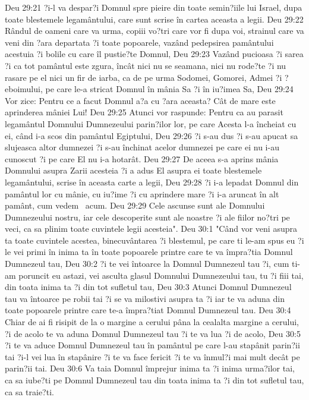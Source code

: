 Deu 29:21  ?i-l va despar?i Domnul spre pieire din toate semin?iile lui Israel, dupa toate blestemele legamântului, care sunt scrise în cartea aceasta a legii.
Deu 29:22  Rândul de oameni care va urma, copiii vo?tri care vor fi dupa voi, strainul care va veni din ?ara departata ?i toate popoarele, vazând pedepsirea pamântului acestuia ?i bolile cu care îl pustie?te Domnul,
Deu 29:23  Vazând pucioasa ?i sarea ?i ca tot pamântul este zgura, încât nici nu se seamana, nici nu rode?te ?i nu rasare pe el nici un fir de iarba, ca de pe urma Sodomei, Gomorei, Admei ?i ?eboimului, pe care le-a stricat Domnul în mânia Sa ?i în iu?imea Sa,
Deu 29:24  Vor zice: Pentru ce a facut Domnul a?a cu ?ara aceasta? Cât de mare este aprinderea mâniei Lui!
Deu 29:25  Atunci vor raspunde: Pentru ca au parasit legamântul Domnului Dumnezeului parin?ilor lor, pe care Acesta l-a încheiat cu ei, când i-a scos din pamântul Egiptului,
Deu 29:26  ?i s-au dus ?i s-au apucat sa slujeasca altor dumnezei ?i s-au închinat acelor dumnezei pe care ei nu i-au cunoscut ?i pe care El nu i-a hotarât.
Deu 29:27  De aceea s-a aprins mânia Domnului asupra Zarii acesteia ?i a adus El asupra ei toate blestemele legamântului, scrise în aceasta carte a legii,
Deu 29:28  ?i i-a lepadat Domnul din pamântul lor cu mânie, cu iu?ime ?i cu aprindere mare ?i i-a aruncat în alt pamânt, cum vedem  acum.
Deu 29:29  Cele ascunse sunt ale Domnului Dumnezeului nostru, iar cele descoperite sunt ale noastre ?i ale fiilor no?tri pe veci, ca sa plinim toate cuvintele legii acesteia".
Deu 30:1  "Când vor veni asupra ta toate cuvintele acestea, binecuvântarea ?i blestemul, pe care ti le-am spus eu ?i le vei primi în inima ta în toate popoarele printre care te va împra?tia Domnul Dumnezeul tau,
Deu 30:2  ?i te vei întoarce la Domnul Dumnezeul tau ?i, cum ti-am poruncit eu astazi, vei asculta glasul Domnului Dumnezeului tau, tu ?i fiii tai, din toata inima ta ?i din tot sufletul tau,
Deu 30:3  Atunci Domnul Dumnezeul tau va întoarce pe robii tai ?i se va milostivi asupra ta ?i iar te va aduna din toate popoarele printre care te-a împra?tiat Domnul Dumnezeul tau.
Deu 30:4  Chiar de ai fi risipit de la o margine a cerului pâna la cealalta margine a cerului, ?i de acolo te va aduna Domnul Dumnezeul tau ?i te va lua ?i de acolo,
Deu 30:5  ?i te va aduce Domnul Dumnezeul tau în pamântul pe care l-au stapânit parin?ii tai ?i-l vei lua în stapânire ?i te va face fericit ?i te va înmul?i mai mult decât pe parin?ii tai.
Deu 30:6  Va taia Domnul împrejur inima ta ?i inima urma?ilor tai, ca sa iube?ti pe Domnul Dumnezeul tau din toata inima ta ?i din tot sufletul tau, ca sa traie?ti.
